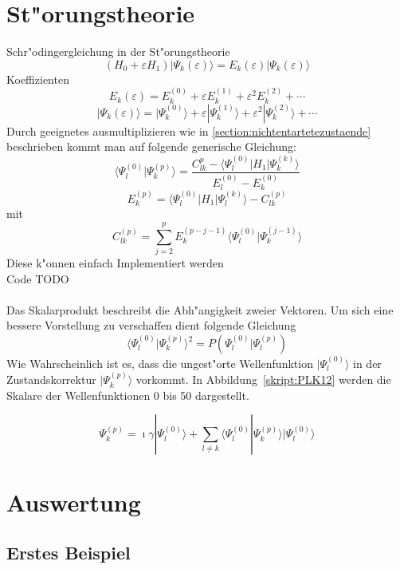 \begin{refsection}
\section{St"orungstheorie}
Schr"odingergleichung in der St"orungstheorie
\[
(H_0+\varepsilon H_1)|\Psi_k(\varepsilon)\rangle
=
E_k(\varepsilon)|\Psi_k(\varepsilon)\rangle
\]
Koeffizienten
\[
E_k(\varepsilon)
=
E_k^{(0)}+\varepsilon E_k^{(1)}+\varepsilon^2 E_k^{(2)}+\dotsb
\]
\[
|\Psi_k(\varepsilon)\rangle
=
|\Psi_k^{(0)}\rangle+\varepsilon|\Psi_k^{(1)}\rangle+
\varepsilon^2|\Psi_k^{(2)}\rangle+\dotsb
\]
Durch geeignetes ausmultiplizieren wie in \ref{section:nichtentartetezustaende}  beschrieben kommt man auf folgende generische Gleichung:
\[
\langle\Psi_l^{(0)}|\Psi_k^{(p)}\rangle
=
\frac{C_{lk}^{p}-\langle\Psi_l^{(0)}|H_1|\Psi_k^{(k)}\rangle}
{E_l^{(0)}-E_k^{(0)}}
\]
\[
E_k^{(p)}
=
\langle\Psi_l^{(0)}|H_1|\Psi_l^{(k)}\rangle-C_{lk}^{(p)}
\]
mit
\[
C_{lk}^{(p)}
=
\displaystyle\sum_{j=2}^{p} E_k^{(p-j-1)}
\langle\Psi_l^{(0)}|\Psi_k^{(j-1)}\rangle
\]
Diese k"onnen einfach Implementiert werden\\
Code TODO\\
\\
Das Skalarprodukt beschreibt die Abh"angigkeit zweier Vektoren. Um sich eine bessere Vorstellung zu verschaffen dient folgende Gleichung
\[
\langle\Psi_l^{(0)}|\Psi_k^{(p)}\rangle^2
=
P(\Psi_l^{(0)}|\Psi_l^{(p)})
\]
Wie Wahrscheinlich ist es, dass die ungest"orte Wellenfunktion $|\Psi_l^{(0)}\rangle$ in der Zustandskorrektur $|\Psi_k^{(p)}\rangle$ vorkommt. In Abbildung~\ref{skript:PLK12} werden die Skalare der Wellenfunktionen 0 bis 50 dargestellt.

\[
\Psi_k^{(p)}
=
\imath\gamma|\Psi_l^{(0)}\rangle+
\displaystyle\sum_{l\neq k} \langle\Psi_l^{(0)}|\Psi_k^{(p)}\rangle
|\Psi_l^{(0)}\rangle
\]

\section{Auswertung}

\subsection{Erstes Beispiel}


\end{refsection}
